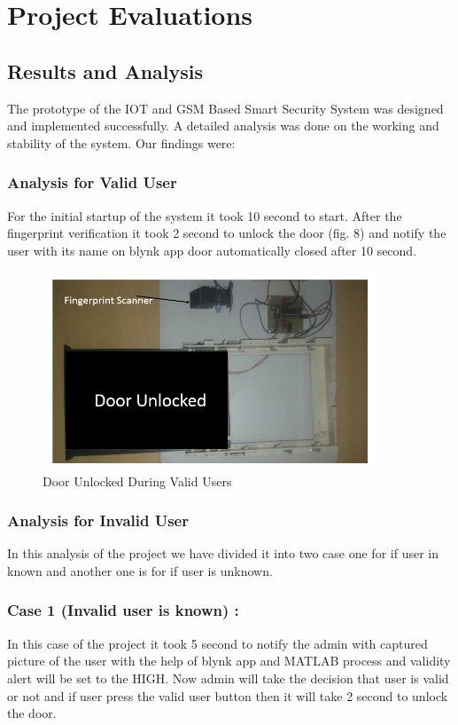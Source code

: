 \documentclass[twoside,a4paper,16pt]{book}
\begin{document}
{{ \chapter{Project Evaluations }
 \section{Results and Analysis}
 The prototype of the IOT and GSM Based Smart Security System was designed and implemented successfully. A detailed analysis was done on the working and stability of the system. Our findings were:
 \subsection{Analysis for Valid User}
       For the initial startup of the system it took 10 second to start. After the fingerprint verification it took 2 second to unlock the door (fig. 8) and notify the user with its name on blynk app door automatically closed after 10 second.
 \begin{figure}[ht!]
 	\begin{center}
 		\includegraphics[width=10.0cm]{ff.png}
 		\caption{Door Unlocked During Valid Users }
 	\end{center}
 \end{figure}
\subsection{Analysis for Invalid User}
In this analysis of the project we have divided it into two case one for if user in known and another one is for if user is unknown.
\subsection*{Case 1 (Invalid user is known) :}
In this case of the project it took 5 second to notify the admin with captured picture of the user with the help of blynk app  and MATLAB process  and validity alert will be set to the HIGH. Now admin will take the decision that user is valid or not and if user press the valid user button then it will take 2 second to unlock the door. 
}}
\end{document}
